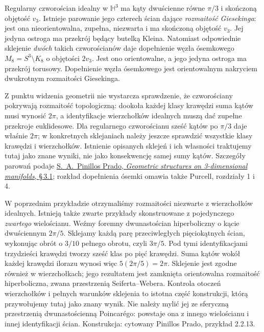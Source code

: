 \begin{przyklad}
\label{prz:thur-dop-gieseking-osemka}
Regularny czworościan idealny w $\mathbb H^3$ ma kąty
dwuścienne równe $\pi/3$ i skończoną objętość $v_3$.
Istnieje parowanie jego czterech ścian dające
\emph{rozmaitość Giesekinga}: jest ona nieorientowalna,
zupełna, niezwarta i ma skończoną objętość $v_3$.
Jej jedyna ostroga ma przekrój będący butelką Kleina.
Natomiast odpowiednie sklejenie \emph{dwóch} takich
czworościanów daje dopełnienie węzła ósemkowego
$M_8=S^3\setminus K_8$ o objętości $2v_3$.
Jest ono orientowalne, a jego jedyna ostroga ma przekrój torusowy.
Dopełnienie węzła ósemkowego jest orientowalnym
nakryciem dwukrotnym rozmaitości Giesekinga.

Z punktu widzenia geometrii nie wystarcza sprawdzenie,
że czworościany pokrywają rozmaitość topologiczną:
dookoła każdej klasy krawędzi suma kątów musi wynosić
$2\pi$, a identyfikacje wierzchołków idealnych
muszą dać zupełne przekroje euklidesowe.
Dla regularnego czworościanu sześć kątów po $\pi/3$
daje właśnie $2\pi$; w konkretnych sklejaniach należy
jeszcze sprawdzić wszystkie klasy krawędzi i wierzchołków.
Istnienie opisanych sklejeń i ich własności traktujemy
tutaj jako znane wyniki, nie jako konsekwencję samej sumy kątów.
Szczegóły parowań podaje
\href{https://www.mat.ufmg.br/posgrad/wp-content/uploads/TesesDissertacoes/Diss370.pdf}
{S.\ A.\ Pinillos Prado, \emph{Geometric structures on
3-dimensional manifolds}, \S\,3.1}; rozkład dopełnienia ósemki
omawia także Purcell, rozdziały 1 i 4.
\end{przyklad}


\begin{przyklad}
\label{prz:thur-dop-seifert-weber}
W poprzednim przykładzie otrzymaliśmy rozmaitości niezwarte
z wierzchołków idealnych. Istnieją także zwarte przykłady
skonstruowane z pojedynczego \emph{zwartego} wielościanu.
Weźmy foremny dwunastościan hiperboliczny o kącie dwuściennym
$2\pi/5$. Sklejamy każdą parę przeciwległych pięciokątnych
ścian, wykonując obrót o $3/10$ pełnego obrotu, czyli $3\pi/5$.
Pod tymi identyfikacjami trzydzieści krawędzi tworzy
sześć klas po pięć krawędzi. Suma kątów wokół każdej
krawędzi ilorazu wynosi więc $5(2\pi/5)=2\pi$.
Sklejenie jest zgodne również w wierzchołkach; jego
rezultatem jest zamknięta orientowalna rozmaitość
hiperboliczna, zwana przestrzenią Seiferta--Webera.
Kontrola otoczeń wierzchołków i pełnych warunków
sklejenia to istotna część konstrukcji, którą
przywołujemy tutaj jako znany wynik.
Nie należy mylić jej ze sferyczną przestrzenią
dwunastościenną Poincarégo: powstaje ona z innego
wielościanu i innej identyfikacji ścian.
Konstrukcja: cytowany Pinillos Prado, przykład 2.2.13.
\end{przyklad}

